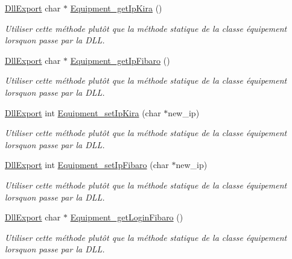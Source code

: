 \begin{DoxyCompactItemize}
\hyperlink{_room_8h_af83a0ad9d707a0bc5fe281b6e5c358a1}{Dll\+Export} char $\ast$ \hyperlink{namespace_e_p_af97eff90050a49f7562745e5f2cffa5e}{Equipment\+\_\+get\+Ip\+Kira} ()
\begin{DoxyCompactList}\small\item\em Utiliser cette méthode plutôt que la méthode statique de la classe équipement lorsqu\textquotesingle{}on passe par la D\+LL. \end{DoxyCompactList}\item 
\hyperlink{_room_8h_af83a0ad9d707a0bc5fe281b6e5c358a1}{Dll\+Export} char $\ast$ \hyperlink{namespace_e_p_a18b583c6fd3512e964ff72883ade7a1d}{Equipment\+\_\+get\+Ip\+Fibaro} ()
\begin{DoxyCompactList}\small\item\em Utiliser cette méthode plutôt que la méthode statique de la classe équipement lorsqu\textquotesingle{}on passe par la D\+LL. \end{DoxyCompactList}\item 
\hyperlink{_room_8h_af83a0ad9d707a0bc5fe281b6e5c358a1}{Dll\+Export} int \hyperlink{namespace_e_p_a97a09c6c9a5de299d2284e5fab1d8fe5}{Equipment\+\_\+set\+Ip\+Kira} (char $\ast$new\+\_\+ip)
\begin{DoxyCompactList}\small\item\em Utiliser cette méthode plutôt que la méthode statique de la classe équipement lorsqu\textquotesingle{}on passe par la D\+LL. \end{DoxyCompactList}\item 
\hyperlink{_room_8h_af83a0ad9d707a0bc5fe281b6e5c358a1}{Dll\+Export} int \hyperlink{namespace_e_p_a39d3138ecfec2ff4c883e5d9f0ec710b}{Equipment\+\_\+set\+Ip\+Fibaro} (char $\ast$new\+\_\+ip)
\begin{DoxyCompactList}\small\item\em Utiliser cette méthode plutôt que la méthode statique de la classe équipement lorsqu\textquotesingle{}on passe par la D\+LL. \end{DoxyCompactList}\item 
\hyperlink{_room_8h_af83a0ad9d707a0bc5fe281b6e5c358a1}{Dll\+Export} char $\ast$ \hyperlink{namespace_e_p_affeb4f6aa0763cce27bdfc0a758ace8a}{Equipment\+\_\+get\+Login\+Fibaro} ()
\begin{DoxyCompactList}\small\item\em Utiliser cette méthode plutôt que la méthode statique de la classe équipement lorsqu\textquotesingle{}on passe par la D\+LL. \end{DoxyCompactList}\item 

\end{DoxyCompactItemize}
